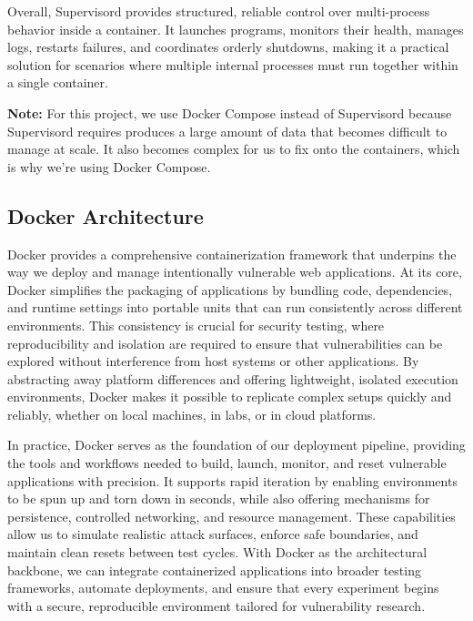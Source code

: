 \documentclass[12pt,titlepage]{article}
\begin{document}
Overall, Supervisord provides structured, reliable control over multi-process behavior inside a container. It launches programs, monitors their health, manages logs, restarts failures, and coordinates orderly shutdowns, making it a practical solution for scenarios where multiple internal processes must run together within a single container.

\textbf{Note:} For this project, we use Docker Compose instead of Supervisord because Supervisord requires produces a large amount of data that becomes difficult to manage at scale. It also becomes complex for us to fix onto the containers, which is why we're using Docker Compose.

\subsection{Docker Architecture}
Docker provides a comprehensive containerization framework that underpins the way we deploy and manage intentionally vulnerable web applications. At its core, Docker simplifies the packaging of applications by bundling code, dependencies, and runtime settings into portable units that can run consistently across different environments. This consistency is crucial for security testing, where reproducibility and isolation are required to ensure that vulnerabilities can be explored without interference from host systems or other applications. By abstracting away platform differences and offering lightweight, isolated execution environments, Docker makes it possible to replicate complex setups quickly and reliably, whether on local machines, in labs, or in cloud platforms.

In practice, Docker serves as the foundation of our deployment pipeline, providing the tools and workflows needed to build, launch, monitor, and reset vulnerable applications with precision. It supports rapid iteration by enabling environments to be spun up and torn down in seconds, while also offering mechanisms for persistence, controlled networking, and resource management. These capabilities allow us to simulate realistic attack surfaces, enforce safe boundaries, and maintain clean resets between test cycles. With Docker as the architectural backbone, we can integrate containerized applications into broader testing frameworks, automate deployments, and ensure that every experiment begins with a secure, reproducible environment tailored for vulnerability research.
\end{document}
